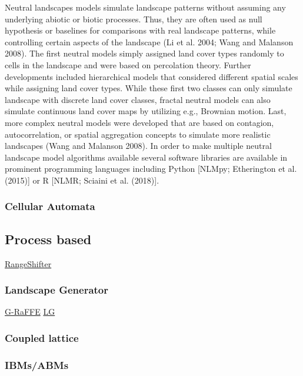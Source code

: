 \documentclass[
  12pt,
  a4paperpaper,
]{article}
\begin{document}
Neutral landscapes models simulate landscape patterns without assuming
any underlying abiotic or biotic processes. Thus, they are often used as
null hypothesis or baselines for comparisons with real landscape
patterns, while controlling certain aspects of the landscape (Li et al.
2004; Wang and Malanson 2008). The first neutral models simply assigned
land cover types randomly to cells in the landscape and were based on
percolation theory. Further developments included hierarchical models
that considered different spatial scales while assigning land cover
types. While these first two classes can only simulate landscape with
discrete land cover classes, fractal neutral models can also simulate
continuous land cover maps by utilizing e.g., Brownian motion. Last,
more complex neutral models were developed that are based on contagion,
autocorrelation, or spatial aggregation concepts to simulate more
realistic landscapes (Wang and Malanson 2008). In order to make multiple
neutral landscape model algorithms available several software libraries
are available in prominent programming languages including Python
{[}NLMpy; Etherington et al. (2015){]} or R {[}NLMR; Sciaini et al.
(2018){]}.

\subsubsection{Cellular Automata}\label{cellular-automata}

\subsection{Process based}\label{process-based}

\href{https://doi.org/10.1111/ecog.05687}{RangeShifter}

\subsubsection{Landscape Generator}\label{landscape-generator}

\href{https://doi.org/10.1371/journal.pone.0064968}{G-RaFFE}
\href{https://doi.org/10.1002/ece3.2145}{LG}

\subsubsection{Coupled lattice}\label{coupled-lattice}

\subsubsection{IBMs/ABMs}\label{ibmsabms}
\end{document}
